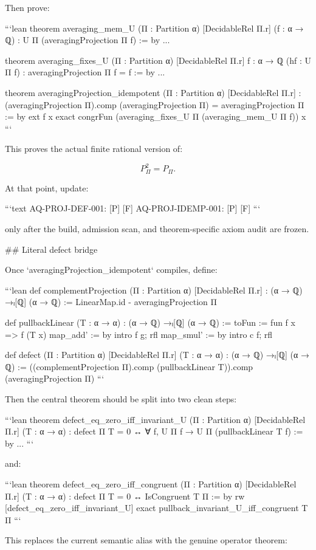 Then prove:

```lean
theorem averaging_mem_U
    (Π : Partition α) [DecidableRel Π.r] (f : α → ℚ) :
    U Π (averagingProjection Π f) := by
  ...

theorem averaging_fixes_U
    (Π : Partition α) [DecidableRel Π.r]
    {f : α → ℚ} (hf : U Π f) :
    averagingProjection Π f = f := by
  ...

theorem averagingProjection_idempotent
    (Π : Partition α) [DecidableRel Π.r] :
    (averagingProjection Π).comp (averagingProjection Π)
      = averagingProjection Π := by
  ext f x
  exact congrFun (averaging_fixes_U Π (averaging_mem_U Π f)) x
```

This proves the actual finite rational version of:

$$
P_\Pi^2=P_\Pi.
$$

At that point, update:

```text
AQ-PROJ-DEF-001: [P] [F]
AQ-PROJ-IDEMP-001: [P] [F]
```

only after the build, admission scan, and theorem-specific axiom audit are frozen.

## Literal defect bridge

Once `averagingProjection_idempotent` compiles, define:

```lean
def complementProjection (Π : Partition α) [DecidableRel Π.r] :
    (α → ℚ) →ₗ[ℚ] (α → ℚ) :=
  LinearMap.id - averagingProjection Π

def pullbackLinear (T : α → α) :
    (α → ℚ) →ₗ[ℚ] (α → ℚ) :=
{ toFun := fun f x => f (T x)
  map_add' := by intro f g; rfl
  map_smul' := by intro c f; rfl }

def defect (Π : Partition α) [DecidableRel Π.r] (T : α → α) :
    (α → ℚ) →ₗ[ℚ] (α → ℚ) :=
  ((complementProjection Π).comp (pullbackLinear T)).comp
    (averagingProjection Π)
```

Then the central theorem should be split into two clean steps:

```lean
theorem defect_eq_zero_iff_invariant_U
    (Π : Partition α) [DecidableRel Π.r] (T : α → α) :
    defect Π T = 0 ↔
      ∀ f, U Π f → U Π (pullbackLinear T f) := by
  ...
```

and:

```lean
theorem defect_eq_zero_iff_congruent
    (Π : Partition α) [DecidableRel Π.r] (T : α → α) :
    defect Π T = 0 ↔
      IsCongruent T Π := by
  rw [defect_eq_zero_iff_invariant_U]
  exact pullback_invariant_U_iff_congruent T Π
```

This replaces the current semantic alias with the genuine operator theorem:

